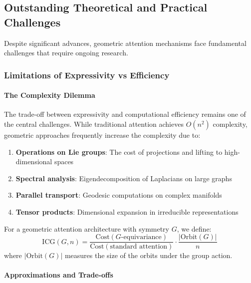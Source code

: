 \subsection{Outstanding Theoretical and Practical Challenges}

Despite significant advances, geometric attention mechanisms face fundamental challenges that require ongoing research.

\subsubsection{Limitations of Expressivity vs Efficiency}

\paragraph{The Complexity Dilemma}

The trade-off between expressivity and computational efficiency remains one of the central challenges. While traditional attention achieves $O(n^2)$ complexity, geometric approaches frequently increase the complexity due to:

\begin{enumerate}
    \item \textbf{Operations on Lie groups}: The cost of projections and lifting to high-dimensional spaces
    \item \textbf{Spectral analysis}: Eigendecomposition of Laplacians on large graphs
    \item \textbf{Parallel transport}: Geodesic computations on complex manifolds
    \item \textbf{Tensor products}: Dimensional expansion in irreducible representations
\end{enumerate}

\begin{definition}
For a geometric attention architecture with symmetry $G$, we define:
\begin{equation}
\text{ICG}(G, n) = \frac{\text{Cost}(G\text{-equivariance})}{\text{Cost}(\text{standard attention})} \cdot \frac{|\text{Orbit}(G)|}{n}
\label{eq:geometric_complexity_index}
\end{equation}
where $|\text{Orbit}(G)|$ measures the size of the orbits under the group action.
\end{definition}

\paragraph{Approximations and Trade-offs}

